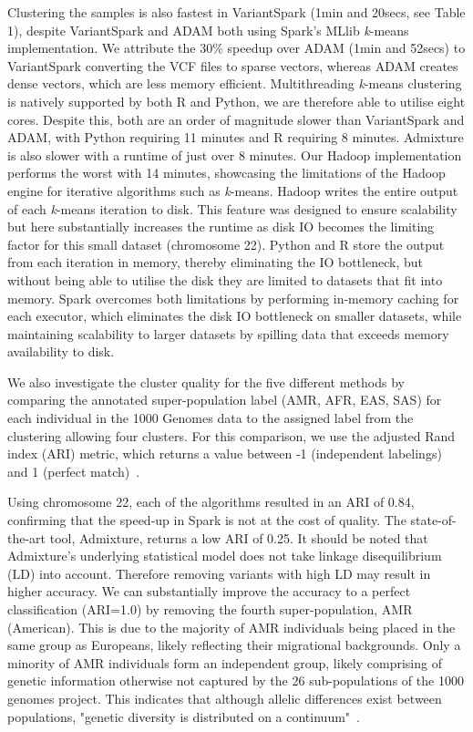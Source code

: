 \documentclass{bmcart}
\newcommand{\variantSpark}{{\sc VariantSpark}}
\newcommand{\kMeans}{\textit{k}-means}
\newcommand{\ARI}{adjusted Rand index}
\begin{document}
Clustering the samples is also fastest in \variantSpark{} (1min and 20secs, see Table 1), despite \variantSpark{} and {\sc ADAM} both using {\sc Spark}'s MLlib \kMeans{} implementation. %
We attribute the 30\% speedup over {\sc ADAM} (1min and 52secs) to \variantSpark{} converting the VCF files to sparse vectors, whereas {\sc ADAM} creates dense vectors, which are less memory efficient. %
Multithreading \kMeans{} clustering is natively supported by both R and Python, we are therefore able to utilise eight cores. 
Despite this, both are an order of magnitude slower than \variantSpark{} and {\sc ADAM}, with Python requiring 11 minutes  and R requiring 8 minutes. %
{\sc Admixture} is also slower with a runtime of just over 8 minutes. 
Our Hadoop implementation performs the worst with 14 minutes, showcasing the limitations of the Hadoop engine for iterative algorithms such as \kMeans{}. %
Hadoop writes the entire output of each \kMeans{} iteration to disk. This feature was designed to ensure scalability but here substantially increases the runtime as disk IO becomes the limiting factor for this small dataset (chromosome 22).
Python and R store the output from each iteration in memory, thereby eliminating the IO bottleneck, but without being able to utilise the disk they are limited to datasets that fit into memory.
{\sc Spark} overcomes both limitations by performing in-memory caching for each executor, which eliminates the disk IO bottleneck on smaller datasets, while maintaining scalability to larger datasets by spilling data that exceeds memory availability to disk.

We also investigate the cluster quality for the five different methods by comparing the annotated super-population label (AMR, AFR, EAS, SAS) for each individual in the 1000 Genomes data to the assigned label from the clustering allowing four clusters. 
For this comparison, we use the \ARI{} (ARI) metric, which returns a value between -1 (independent labelings) and 1 (perfect match)~\cite{Hubert1985}.

Using chromosome 22, each of the algorithms resulted in an ARI of 0.84, confirming that the speed-up in {\sc Spark} is not at the cost of quality.
The state-of-the-art tool, {\sc Admixture}, returns a low ARI of 0.25. It should be noted that {\sc Admixture}'s underlying statistical model does not take linkage disequilibrium (LD) into account. 
Therefore removing variants with high LD may result in higher accuracy. 
We can substantially improve the accuracy to a perfect classification (ARI=1.0) by removing the fourth super-population, AMR (American). 
This is due to the majority of AMR individuals being placed in the same group as Europeans, likely reflecting their migrational backgrounds. 
Only a minority of AMR individuals form an independent group, likely comprising of genetic information otherwise not captured by the 26 sub-populations of the 1000 genomes project.
This indicates that although allelic differences exist between populations, "genetic diversity is distributed on a continuum"~\cite{Pugach2015}.
\end{document}
